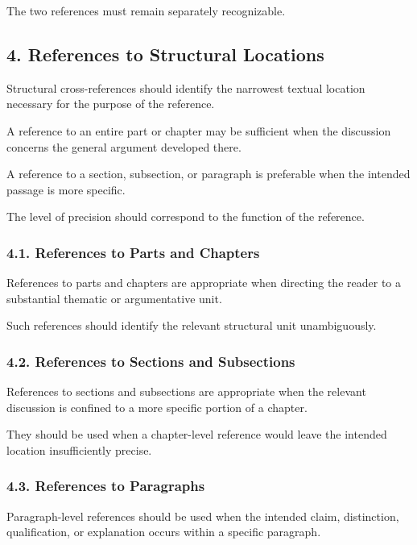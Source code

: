 The two references must remain separately
recognizable.


\subsection*{4. References to Structural Locations}

Structural cross-references should identify
the narrowest textual location necessary
for the purpose of the reference.

A reference to an entire part or chapter may
be sufficient when the discussion concerns
the general argument developed there.

A reference to a section, subsection, or
paragraph is preferable when the intended
passage is more specific.

The level of precision should correspond
to the function of the reference.

\subsubsection*{4.1. References to Parts and Chapters}

References to parts and chapters are appropriate
when directing the reader to a substantial
thematic or argumentative unit.

Such references should identify the relevant
structural unit unambiguously.

\subsubsection*{4.2. References to Sections and Subsections}

References to sections and subsections are
appropriate when the relevant discussion
is confined to a more specific portion
of a chapter.

They should be used when a chapter-level
reference would leave the intended location
insufficiently precise.

\subsubsection*{4.3. References to Paragraphs}

Paragraph-level references should be used
when the intended claim, distinction,
qualification, or explanation occurs
within a specific paragraph.

